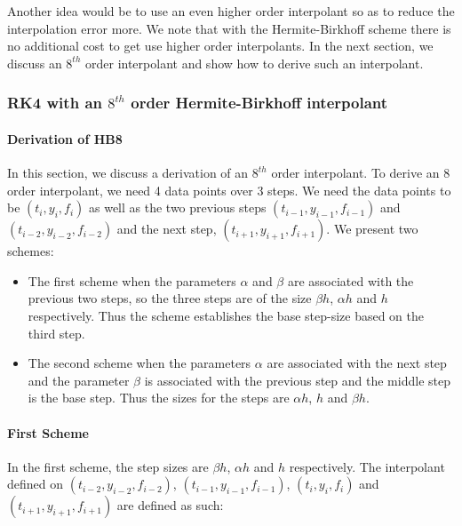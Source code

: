 \documentclass{article}
\begin{document}
Another idea would be to use an even higher order interpolant so as to reduce the interpolation error more. We note that with the Hermite-Birkhoff scheme there is no additional cost to get use higher order interpolants. In the next section, we discuss an $8^{th}$ order interpolant and show how to derive such an interpolant.

\subsubsection{RK4 with an $8^{th}$ order Hermite-Birkhoff interpolant}
\paragraph{Derivation of HB8}
In this section, we discuss a derivation of an $8^{th}$ order interpolant. To derive an 8 order interpolant, we need 4 data points over 3 steps. We need the data points to be $(t_i, y_i, f_i)$ as well as the two previous steps $(t_{i-1}, y_{i-1}, f_{i-1})$ and $(t_{i-2}, y_{i-2}, f_{i-2})$ and the next step, $(t_{i+1}, y_{i+1}, f_{i+1})$. We present two schemes: 
\begin{itemize}
\item The first scheme when the parameters $\alpha$ and $\beta$ are associated with the previous two steps, so the three steps are of the size $\beta h$, $\alpha h$ and $h$ respectively. Thus the scheme establishes the base step-size based on the third step. 

\item The second scheme when the parameters $\alpha$ are associated with the next step and the parameter $\beta$ is associated with the previous step and the middle step is the base step. Thus the sizes for the steps are $\alpha h$, $h$ and $\beta h$. 

\end{itemize}


\paragraph{First Scheme}
In the first scheme, the step sizes are $\beta h$, $\alpha h$ and $h$ respectively. The interpolant defined on $(t_{i-2}, y_{i-2}, f_{i-2})$, $(t_{i-1}, y_{i-1}, f_{i-1})$, $(t_i, y_i, f_i)$ and $(t_{i + 1}, y_{i + 1}, f_{i + 1})$ are defined as such:
\end{document}
